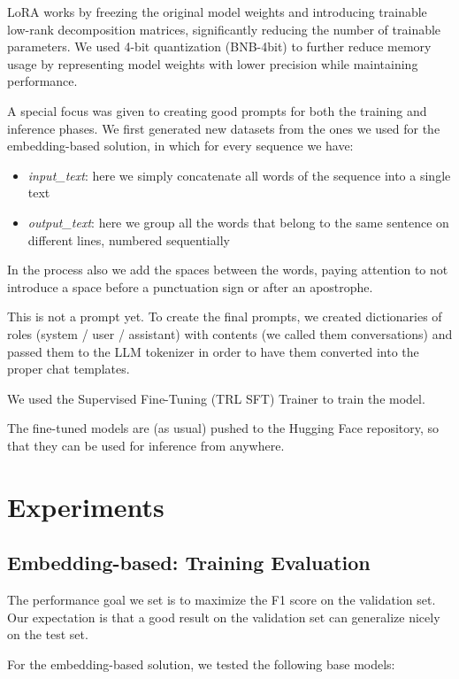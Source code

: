 \documentclass[11pt]{article}
\begin{document}
LoRA works by freezing the original model weights and introducing trainable low-rank decomposition matrices, significantly reducing the number of trainable parameters. We used 4-bit quantization (BNB-4bit) to further reduce memory usage by representing model weights with lower precision while maintaining performance.

A special focus was given to creating good prompts for both the training and inference phases.
We first generated new datasets from the ones we used for the embedding-based solution, in which 
for every sequence we have:

 \begin{itemize}
 	\item \emph{input\_text}: here we simply concatenate all words of the sequence into a single text
 	\item \emph{output\_text}: here we group all the words that belong to the same sentence on different lines, numbered sequentially
 \end{itemize}
 
 In the process also we add the spaces between the words, paying attention to
 not introduce a space before a punctuation sign or after an apostrophe.
 
 This is not a prompt yet. To create the final prompts, we created dictionaries of roles (system / user / assistant) with contents (we called them conversations) and passed them to the LLM tokenizer in order to have them converted into the proper chat templates. 
 
 We used the Supervised Fine-Tuning (TRL SFT) Trainer to train the model.

The fine-tuned models are (as usual) pushed to the Hugging Face repository, so that they can be used for inference from anywhere.

\section{Experiments}

\subsection{Embedding-based: Training Evaluation}

The performance goal we set is to maximize the F1 score on the validation set. Our expectation is that a good result on the
validation set can generalize nicely on the test set.

For the embedding-based solution, we tested the following base models:
\end{document}
